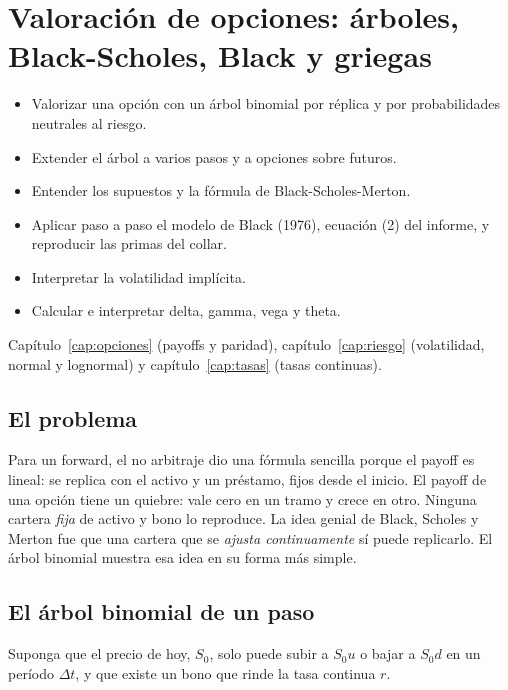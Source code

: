 \chapter{Valoración de opciones: árboles, Black-Scholes, Black y griegas}\label{cap:valoracion}

\begin{objetivos}
\begin{itemize}
\item Valorizar una opción con un árbol binomial por réplica y por probabilidades neutrales al riesgo.
\item Extender el árbol a varios pasos y a opciones sobre futuros.
\item Entender los supuestos y la fórmula de Black-Scholes-Merton.
\item Aplicar paso a paso el modelo de Black (1976), ecuación (2) del informe, y reproducir las primas del collar.
\item Interpretar la volatilidad implícita.
\item Calcular e interpretar delta, gamma, vega y theta.
\end{itemize}
\end{objetivos}

\begin{prerreq}Capítulo~\ref{cap:opciones} (payoffs y paridad), capítulo~\ref{cap:riesgo} (volatilidad, normal y lognormal) y capítulo~\ref{cap:tasas} (tasas continuas).\end{prerreq}

\section{El problema}

Para un forward, el no arbitraje dio una fórmula sencilla porque el payoff es lineal: se replica con el activo y un préstamo, fijos desde el inicio. El payoff de una opción tiene un quiebre: vale cero en un tramo y crece en otro. Ninguna cartera \emph{fija} de activo y bono lo reproduce. La idea genial de Black, Scholes y Merton fue que una cartera que se \emph{ajusta continuamente} sí puede replicarlo. El árbol binomial muestra esa idea en su forma más simple.

\section{El árbol binomial de un paso}

Suponga que el precio de hoy, $S_0$, solo puede subir a $S_0u$ o bajar a $S_0d$ en un período $\Delta t$, y que existe un bono que rinde la tasa continua $r$.

